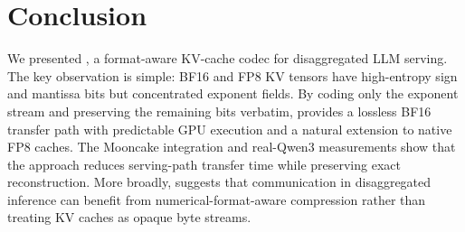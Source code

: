 \section{Conclusion}
\label{sec:conclusion}

We presented \splitzip, a format-aware KV-cache codec for disaggregated LLM serving. The key observation is simple: BF16 and FP8 KV tensors have high-entropy sign and mantissa bits but concentrated exponent fields. By coding only the exponent stream and preserving the remaining bits verbatim, \splitzip provides a lossless BF16 transfer path with predictable GPU execution and a natural extension to native FP8 caches. The Mooncake integration and real-Qwen3 measurements show that the approach reduces serving-path transfer time while preserving exact reconstruction. More broadly, \splitzip suggests that communication in disaggregated inference can benefit from numerical-format-aware compression rather than treating KV caches as opaque byte streams.
